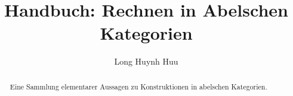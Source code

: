 \documentclass[3p]{elsarticle}
\title{Handbuch: Rechnen in Abelschen Kategorien}
\author{Long Huynh Huu}
\begin{document}
\maketitle
\tableofcontents


\begin{abstract}
Eine Sammlung elementarer Aussagen zu Konstruktionen in abelschen Kategorien.
\end{abstract}






\end{document}

